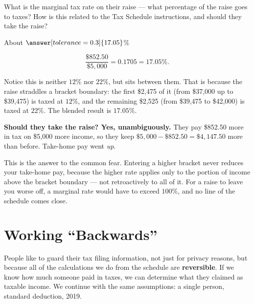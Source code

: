 \documentclass[12pt]{ximera}
\begin{document}
\begin{problem}
What is the marginal tax rate on their raise --- what percentage of the raise goes to
taxes? How is this related to the Tax Schedule instructions, and should they take the
raise?

About $\answer[tolerance=0.3]{17.05}$\%

\begin{freeResponse}
\end{freeResponse}

\begin{solution}
\[
\frac{\$852.50}{\$5{,}000} = 0.1705 = 17.05\%.
\]

Notice this is neither $12\%$ nor $22\%$, but sits between them. That is because the
raise straddles a bracket boundary: the first \$2,475 of it (from \$37,000 up to
\$39,475) is taxed at $12\%$, and the remaining \$2,525 (from \$39,475 to \$42,000) is
taxed at $22\%$. The blended result is $17.05\%$.

\textbf{Should they take the raise? Yes, unambiguously.} They pay \$852.50 more in tax
on \$5,000 more income, so they keep $\$5{,}000 - \$852.50 = \$4{,}147.50$ more than
before. Take-home pay went \emph{up}.

This is the answer to the common fear. Entering a higher bracket never reduces your
take-home pay, because the higher rate applies only to the portion of income above the
bracket boundary --- not retroactively to all of it. For a raise to leave you worse off,
a marginal rate would have to exceed $100\%$, and no line of the schedule comes close.
\end{solution}
\end{problem}

\section*{Working ``Backwards''}

People like to guard their tax filing information, not just for privacy reasons, but
because all of the calculations we do from the schedule are \textbf{reversible}. If we
know how much someone paid in taxes, we can determine what they claimed as taxable
income. We continue with the same assumptions: a single person, standard deduction,
2019.
\end{document}
